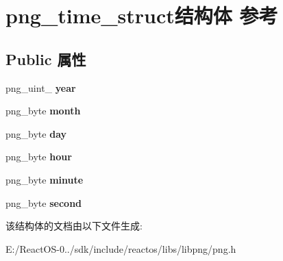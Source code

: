 \hypertarget{structpng__time__struct}{}\section{png\+\_\+time\+\_\+struct结构体 参考}
\label{structpng__time__struct}
\subsection*{Public 属性}
\begin{DoxyCompactItemize}
\item 
\mbox{\label{structpng__time__struct_a5cceb6213fc7b4462435ea1d8fc1c798}} 
png\+\_\+uint\+\_ {\bfseries year}
\item 
\mbox{\label{structpng__time__struct_a3ab550977ee2cb1165c0398131f2e601}} 
png\+\_\+byte {\bfseries month}
\item 
\mbox{\label{structpng__time__struct_afa0f94516a676178d1dabeb96eccdcdb}} 
png\+\_\+byte {\bfseries day}
\item 
\mbox{\label{structpng__time__struct_a79ac8b217254fd87cdc7299e6612a6f4}} 
png\+\_\+byte {\bfseries hour}
\item 
\mbox{\label{structpng__time__struct_ad3ce11e9d92b77a33b3f7480bf0fff8c}} 
png\+\_\+byte {\bfseries minute}
\item 
\mbox{\label{structpng__time__struct_a84e528e4c4c7d76cd2252e0d0d2ed0c9}} 
png\+\_\+byte {\bfseries second}
\end{DoxyCompactItemize}


该结构体的文档由以下文件生成\+:\begin{DoxyCompactItemize}
\item 
E\+:/\+React\+O\+S-\/0../sdk/include/reactos/libs/libpng/png.\+h\end{DoxyCompactItemize}
